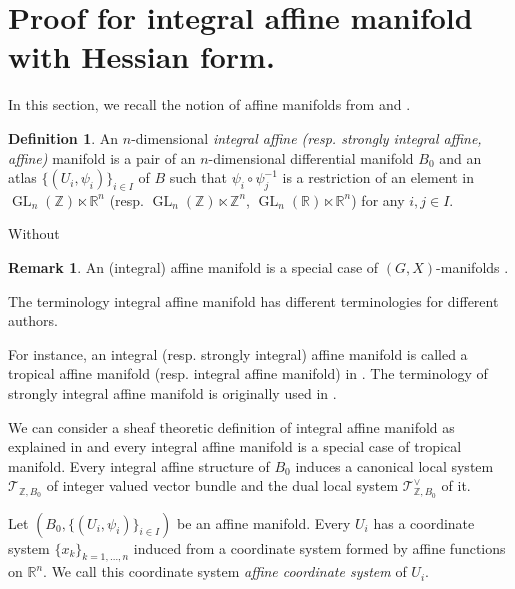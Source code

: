\documentclass[a4paper,dvipdfmx,reqno,12pt]{amsart}
\theoremstyle{definition}
\newtheorem{definition}[theorem]{Definition}
\newtheorem{remark}[theorem]{Remark}
\newcommand{\opn}[1]{\operatorname{#1}}
\numberwithin{equation}{section}
\begin{document}
\section{Proof for integral affine manifold with Hessian form.}
\label{section-integral-affine-manifold}
In this section,
we recall the notion of affine manifolds from
\cite{MR2293045,
goldmanRadianceObstructionParallel1984a,
MR2181810,
grossMirrorSymmetryLogarithmic2006a} and 
\cite[Chapter 6]{MR2567952}.

\begin{definition}
An $n$-dimensional \emph{integral affine 
(resp. strongly integral affine, affine)} manifold
is a pair of an $n$-dimensional differential manifold $B_0$ 
and an atlas $\{(U_i,\psi_i)\}_{i \in I}$ of $B$ such that 
$\psi_i \circ \psi_j^{-1}$ is a restriction of 
an element in $\opn{GL}_n(\mathbb{Z})\ltimes \mathbb{R}^{n}$
(resp. $\opn{GL}_n(\mathbb{Z})\ltimes \mathbb{Z}^{n}$,
$\opn{GL}_n(\mathbb{R})\ltimes \mathbb{R}^{n}$) for any $i,j\in I$.
\end{definition}
Without
\begin{remark}
An (integral) affine manifold is a special case of 
$(G,X)$-manifolds \cite[3.3]{MR1435975}.

The terminology integral affine manifold has 
different terminologies for different authors. 

For instance, an integral (resp. strongly integral) affine manifold 
is called a tropical affine manifold (resp. integral affine manifold)
in \cite[Definition 1.22]{MR2722115}. 
The terminology of strongly integral affine manifold is originally used
in \cite[Remark 5.10]{MR3079343}.
\end{remark}


We can consider a sheaf theoretic definition of 
integral affine manifold as explained 
in \cite[2.1]{MR2181810} 
and every integral affine manifold is a special case of 
tropical manifold. 
Every integral affine structure of $B_0$ induces a 
canonical local system $\mathcal{T}_{\mathbb{Z},B_0}$ 
of integer valued vector bundle and the dual 
local system $\mathcal{T}_{\mathbb{Z},B_0}^{\vee}$ of it.



Let $(B_0,\{(U_i,\psi_i)\}_{i \in I})$ be an affine manifold.
Every  $U_i$ has a coordinate system $\{x_k\}_{k=1,\ldots,n}$ 
induced from a coordinate system formed 
by affine functions on $\mathbb{R}^{n}$.
We call this coordinate system \emph{affine coordinate system} 
of $U_i$. 
\end{document}
